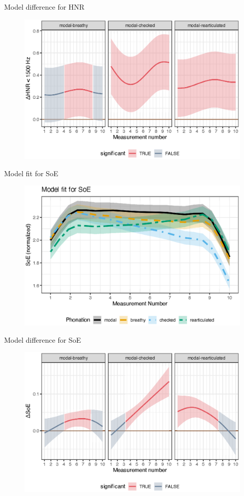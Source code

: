 \documentclass[professionalfont]{beamer}
\begin{document}
\begin{frame}{Model difference for HNR}
  \begin{figure}[h!]
    \centering
    \includegraphics[width = 0.8\linewidth]{images/LCH_GAMMs/hnr15_model_diff.eps}
  \end{figure}
\end{frame}

\begin{frame}{Model fit for SoE}
  \begin{figure}[h!]
    \centering
    \includegraphics[width = 0.8\linewidth]{images/LCH_GAMMs/soe_model_fit.eps}
  \end{figure}
\end{frame}

\begin{frame}{Model difference for SoE}
  \begin{figure}[h!]
    \centering
    \includegraphics[width = 0.8\linewidth]{images/LCH_GAMMs/soe_model_diff.eps}
  \end{figure}
\end{frame}
\end{document}
